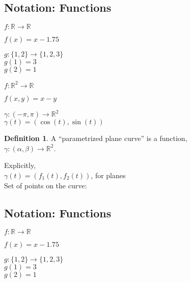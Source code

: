 \documentclass[twocolumn,20pt,fleqn]{extarticle}
\newcommand{\sep}{\vspace{0.5cm}}
\theoremstyle{plain}
\theoremstyle{definition}
\newtheorem*{definition}{Definition}
\theoremstyle{remark}
\begin{document}
\subsection{Notation: Functions}

$ f: \mathbb{R}  \to \mathbb{R}$

$f(x) = x - 1.75$\\

\sep

  $g : \{1,2\} \to \{1,2,3\}$\\
    $g(1) = 3$\\
    $g(2) = 1$\\

\sep

$ f: \mathbb{R}^2  \to \mathbb{R}$

$f(  x,y  ) = x - y$


\sep

$\gamma :  (-\pi,\pi)  \to \mathbb{R}^2$\\
$\gamma(t) = (\cos(t), \sin(t))$



\newpage



\begin{definition}
  A  ``parametrized plane curve''  is a  function,\\ $\gamma  : (\alpha, \beta) \to \mathbb{R}^2$.
\end{definition}

Explicitly,\\
$\gamma(t) = (f_1(t), f_2(t))$, for planes\\

Set of points on the curve:\\ 


\clearpage




\subsection{Notation: Functions}

$ f: \mathbb{R}  \to \mathbb{R}$

$f(x) = x - 1.75$\\

\sep

  $g : \{1,2\} \to \{1,2,3\}$\\
    $g(1) = 3$\\
    $g(2) = 1$\\

\sep
\end{document}
